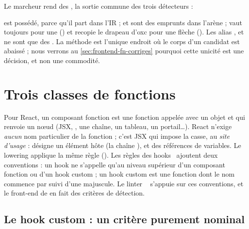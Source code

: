Le marcheur rend des , la sortie commune des trois détecteurs :


 est possédé, parce qu'il part dans l'IR ;  et  sont des emprunts dans l'arène ;  vaut toujours  pour une  () et recopie le drapeau d'oxc pour une flèche (). Les alias ,  et  ne sont que des . La méthode  est l'unique endroit où le corps d'un candidat est abaissé ; nous verrons au \cref{sec:frontend-fn-corriges} pourquoi cette unicité est une décision, et non une commodité.

\section{Trois classes de fonctions}
\label{sec:frontend-classes}

\begin{react}
Pour React, un composant fonction est une fonction appelée avec un objet  et qui renvoie un nœud (JSX, , une chaîne, un tableau, un portail…). React n'exige \emph{aucun} nom particulier de la fonction ; c'est JSX qui impose la casse, au \emph{site d'usage} :  désigne un élément hôte (la chaîne ),  et  des références de variables. Le lowering applique la même règle (). Les règles des hooks~\cite{ReactRulesOfHooks} ajoutent deux conventions : un hook ne s'appelle qu'au niveau supérieur d'un composant fonction ou d'un hook custom ; un hook custom est une fonction dont le nom commence par  suivi d'une majuscule. Le linter ~\cite{EslintReactHooks} s'appuie sur ces conventions, et le front-end de \reactant{} en fait des critères de détection.
\end{react}

\subsection{Le hook custom : un critère purement nominal}

